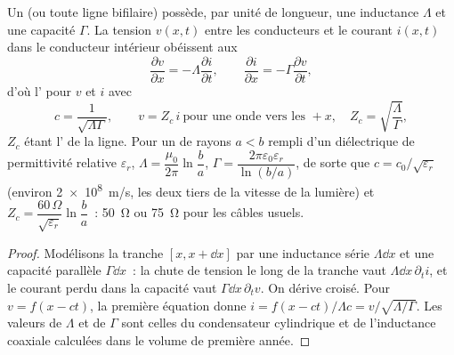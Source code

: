 \begin{proposition}\label{prop:b2:dispersion-wave-packets:coax}
Un  (ou toute ligne bifilaire) possède, par unité de longueur, une
inductance $\Lambda$ et une capacité $\Gamma$. La tension $v(x, t)$ entre
les conducteurs et le courant $i(x, t)$ dans le conducteur intérieur obéissent aux
\emph{}
\[
\frac{\partial v}{\partial x} = -\Lambda\frac{\partial i}{\partial t} , \qquad
\frac{\partial i}{\partial x} = -\Gamma\frac{\partial v}{\partial t} ,
\]
d'où l' pour $v$ et $i$ avec
\[
c = \frac1{\sqrt{\Lambda\Gamma}} , \qquad
v = Z_c\,i \ \text{pour une onde vers les } +x, \quad Z_c = \sqrt{\frac\Lambda\Gamma} ,
\]
$Z_c$ étant l'\emph{} de la ligne. Pour un
 de rayons $a < b$ rempli d'un diélectrique de permittivité
relative $\varepsilon_r$, $\Lambda = \dfrac{\mu_0}{2\pi}\ln\dfrac ba$, $\Gamma =
\dfrac{2\pi\varepsilon_0\varepsilon_r}{\ln(b/a)}$, de sorte que $c = c_0/\sqrt{\varepsilon_r}$ (environ
\qty{2e8}{m/s}, les deux tiers de la vitesse de la lumière) et $Z_c = \dfrac{60\,\Omega}
{\sqrt{\varepsilon_r}}\ln\dfrac ba$~: \qty{50}{\ohm} ou \qty{75}{\ohm} pour les câbles usuels.
\end{proposition}

\begin{proof}
Modélisons la tranche $[x, x + \dd x]$ par une inductance série $\Lambda\dd x$ et une
capacité parallèle $\Gamma\dd x$~: la chute de tension le long de la tranche vaut
$\Lambda\dd x\,\partial_ti$, et le courant perdu dans la capacité vaut $\Gamma\dd x
\,\partial_tv$. On dérive croisé. Pour $v = f(x - ct)$, la première équation
donne $i = f(x - ct)/\Lambda c = v/\sqrt{\Lambda/\Gamma}$. Les valeurs de $\Lambda$ et de
$\Gamma$ sont celles du condensateur cylindrique et de l'inductance
coaxiale calculées dans le volume de première année.
\end{proof}

